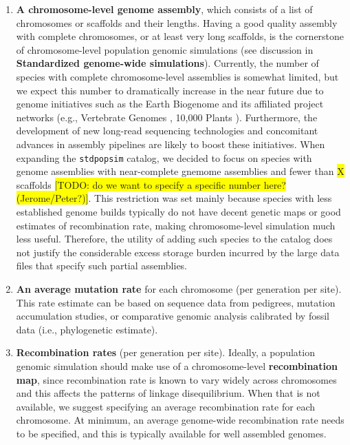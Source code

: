 \documentclass[hidelinks]{article}
\begin{document}
\begin{enumerate}
\def\labelenumi{\arabic{enumi}.}
\item
  \textbf{A chromosome-level genome assembly}, which consists of a list of chromosomes or scaffolds and their lengths. Having a good quality assembly with complete chromosomes, or at least very long scaffolds, is the cornerstone of chromosome-level population genomic simulations (see discussion in \textbf{Standardized genome-wide simulations}). Currently, the number of species with complete chromosome-level assemblies is somewhat limited, but we expect this number to dramatically increase in the near future due to genome initiatives such as the Earth Biogenome \citep{Lewin2022} and its affiliated project networks (e.g.,
  Vertebrate Genomes \citep{Rhie2021}, 10,000 Plants \citep{Cheng2018}).
  Furthermore, the development of new long-read sequencing technologies
  \citep{Amarasinghe2020} and concomitant advances in assembly pipelines
  \citep{Chakraborty2016} are likely to boost these initiatives. When expanding the \texttt{stdpopsim} catalog, we decided to focus on species with genome assemblies with near-complete gnemome assemblies and fewer than \colorbox{yellow}{X} scaffolds 
  \colorbox{yellow}{[TODO: do we want to specify a specific number here? (Jerome/Peter?)]}. This restriction was set mainly because species with less established genome builds typically do not have decent genetic maps or good estimates of recombination rate, making chromosome-level simulation much less useful. Therefore, the utility of adding such species to the catalog does not justify the considerable excess storage burden incurred by the large data files that specify such partial assemblies. 
  

  
  
\item
  \textbf{An average mutation rate} for each chromosome (per generation per site).  
  This rate estimate can be based on sequence data from pedigrees, mutation accumulation studies, or comparative genomic analysis calibrated by fossil data (i.e., phylogenetic estimate). 
  
\item
  \textbf{Recombination rates} (per generation per site).  
  Ideally, a population genomic simulation should make use of a chromosome-level \textbf{recombination map}, since recombination rate is known to vary widely across chromosomes and this affects the patterns of linkage disequilibrium. When that is not available, we suggest specifying an average recombination rate for each chromosome.
  At minimum, an average genome-wide recombination rate needs to be specified, and this is typically available for well assembled genomes. 
  

\end{enumerate}
\end{document}
